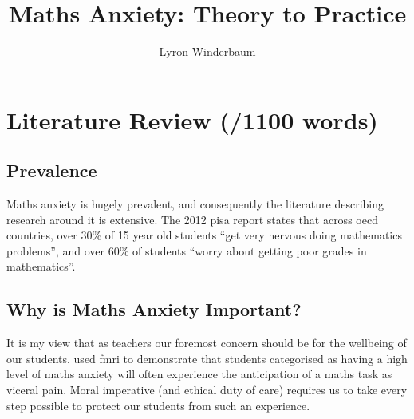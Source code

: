 \documentclass[14pt]{memoir}
\title{Maths Anxiety: Theory to Practice}
\author{Lyron Winderbaum}
\begin{document}
\maketitle



\begin{abstract}

\lipsum[1-2]

\end{abstract}


\glsresetall
\section{Literature Review (/1100 words)}

\subsection*{Prevalence}

Maths anxiety is hugely prevalent, and consequently the literature describing research around it is extensive. The  2012 \gls{pisa} report states that across \gls{oecd} countries, over 30\% of 15 year old students ``get very nervous doing mathematics problems'', and over 60\% of students ``worry about getting poor grades in mathematics''. 

\subsection*{Why is Maths Anxiety Important?}

It is my view that as teachers our foremost concern should be for the wellbeing of our students.  used \gls{fmri} to demonstrate that students categorised as having a high level of maths anxiety will often experience the anticipation of a maths task as viceral pain. Moral imperative (and ethical duty of care) requires us to take every step possible to protect our students from such an experience.
\end{document}
